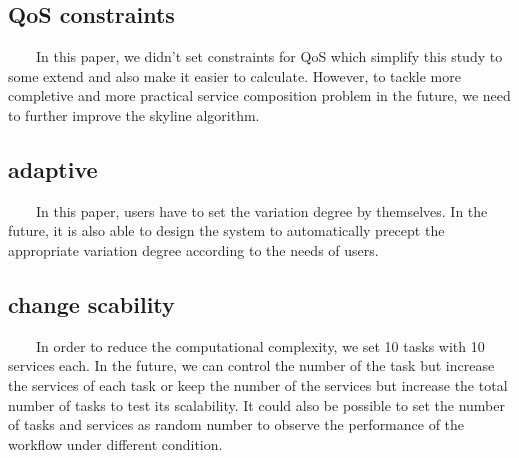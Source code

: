 \documentclass[senior,final,11pt]{iscs-thesis}
\begin{document}
\subsection{QoS constraints}
~~~~In this paper, we didn't set constraints for QoS which simplify this study to some extend and also make it easier to calculate. However, to tackle more completive and more practical service composition problem in the future, we need to further improve the skyline algorithm\cite{yu2007efficient}.
\subsection{adaptive}
~~~~In this paper, users have to set the variation degree by themselves. In the future, it is also able to design the system to automatically precept the appropriate variation degree according to the needs of users.
\subsection{change scability}
~~~~In order to reduce the computational complexity, we set 10 tasks with 10 services each. In the future, we can control the number of the task but increase the services of each task or keep the number of the services but increase the total number of tasks to test its scalability. It could also be possible to set the number of tasks and services as random number to observe the performance of the workflow under different condition.
\end{document}
